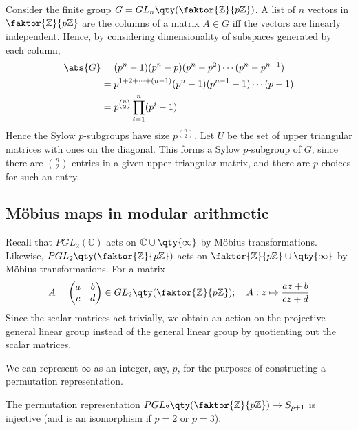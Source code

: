 \begin{example} \label{exm:5.1}
	Consider the finite group $G = GL_n\qty(\faktor{\mathbb Z}{p\mathbb Z})$.
	A list of $n$ vectors in $\faktor{\mathbb Z}{p\mathbb Z}$ are the columns of a matrix $A \in G$ iff the vectors are linearly independent.
	Hence, by considering dimensionality of subspaces generated by each column,
	\begin{align*}
		\abs{G} & = (p^n - 1)(p^n - p)(p^n - p^2) \cdots (p^n - p^{n-1})      \\
		        & = p^{1+2+\dots+(n-1)} (p^n - 1)(p^{n-1} - 1) \cdots (p - 1) \\
		        & = p^{\binom{n}{2}} \prod_{i=1}^n (p^i - 1)
	\end{align*}
	Hence the Sylow $p$-subgroups have size $p^{\binom{n}{2}}$.
	Let $U$ be the set of upper triangular matrices with ones on the diagonal.
	This forms a Sylow $p$-subgroup of $G$, since there are $\binom{n}{2}$ entries in a given upper triangular matrix, and there are $p$ choices for such an entry.
\end{example}

\subsection{M\"obius maps in modular arithmetic}
Recall that $PGL_2(\mathbb C)$ acts on $\mathbb C \cup \qty{\infty}$ by M\"obius transformations.
Likewise, $PGL_2\qty(\faktor{\mathbb Z}{p\mathbb Z})$ acts on $\faktor{\mathbb Z}{p\mathbb Z} \cup \qty{\infty}$ by M\"obius transformations.
For a matrix
\begin{align*}
	A = \begin{pmatrix}
		a & b \\
		c & d
	\end{pmatrix} \in GL_2\qty(\faktor{\mathbb Z}{p\mathbb Z});\quad A : z \mapsto \frac{az+b}{cz+d}
\end{align*}
Since the scalar matrices act trivially, we obtain an action on the projective general linear group instead of the general linear group by quotienting out the scalar matrices.

We can represent $\infty$ as an integer, say, $p$, for the purposes of constructing a permutation representation.

\begin{lemma} \label{lem:5.2}
	The permutation representation $PGL_2\qty(\faktor{\mathbb Z}{p\mathbb Z}) \to S_{p+1}$ is injective (and is an isomorphism if $p = 2$ or $p = 3$).
\end{lemma}


